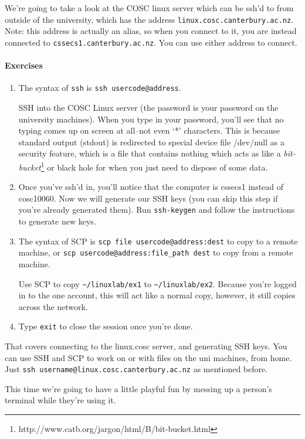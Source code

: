 \documentclass{article}
\begin{document}
We're going to take a look at the COSC linux server which can be ssh'd to from outside of the university, which has the address \texttt{linux.cosc.canterbury.ac.nz}. Note: this address is actually an alias, so when you connect to it, you are instead connected to \texttt{cssecs1.canterbury.ac.nz}. You can use either address to connect.
\paragraph{Exercises}
\begin{enumerate}
\item The syntax of \texttt{ssh} is \texttt{ssh usercode@address}. 

SSH into the COSC Linux server (the password is your password on the university machines). When you type in your password, you'll see that no typing comes up on screen at all--not even `*' characters. This is because standard output (stdout) is redirected to special device file /dev/null as a security feature, which is a file that contains nothing which acts as like a \emph{bit-bucket}\footnote{http://www.catb.org/jargon/html/B/bit-bucket.html} or black hole for when you just need to dispose of some data.

\item Once you've ssh'd in, you'll notice that the computer is cssecs1 instead of cosc10060. Now we will generate our SSH keys (you can skip this step if you're already generated them). Run \texttt{ssh-keygen} and follow the instructions to generate new keys. 
\item The syntax of SCP is \texttt{scp file usercode@address:dest} to copy to a remote machine, or \texttt{scp usercode@address:file_path dest} to copy from a remote machine. 

Use SCP to copy \texttt{\textasciitilde/linuxlab/ex1} to \texttt{\textasciitilde/linuxlab/ex2}. Because you're logged in to the one account, this will act like a normal copy, however, it still copies across the network.  
\item Type \texttt{exit} to close the session once you're done.

\end{enumerate}
That covers connecting to the linux.cosc server, and generating SSH keys. You can use SSH and SCP to work on or with files on the uni machines, from home. Just \texttt{ssh username@linux.cosc.canterbury.ac.nz} as mentioned before.

This time we're going to have a little playful fun by messing up a person's terminal while they're using it.
\end{document}
